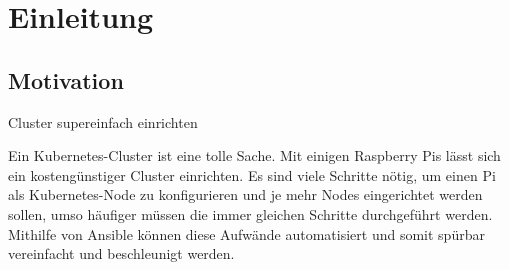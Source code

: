 \chapter{Einleitung}
\section{Motivation}
\glqq Cluster supereinfach einrichten\grqq

Ein Kubernetes-Cluster ist eine tolle Sache.
Mit einigen Raspberry Pis lässt sich ein kostengünstiger Cluster einrichten.
Es sind viele Schritte nötig, um einen Pi als Kubernetes-Node zu konfigurieren und je mehr Nodes eingerichtet werden sollen, umso häufiger müssen die immer gleichen Schritte durchgeführt werden.
Mithilfe von Ansible können diese Aufwände automatisiert und somit spürbar vereinfacht und beschleunigt werden.